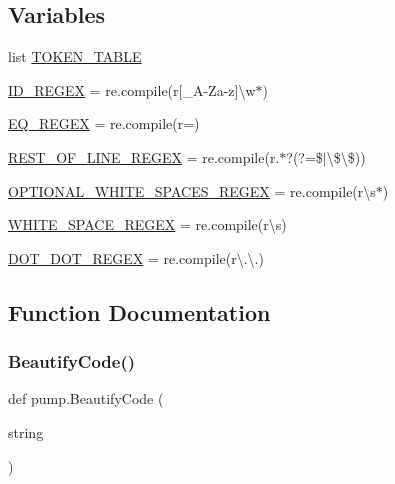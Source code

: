 \subsection*{Variables}
\begin{DoxyCompactItemize}
\item 
list \hyperlink{namespacepump_a132b35d1104c7f479aa21c345f413477}{T\+O\+K\+E\+N\+\_\+\+T\+A\+B\+LE}
\item 
\hyperlink{namespacepump_a8e008923b6c378b8d3df611fb07d6dda}{I\+D\+\_\+\+R\+E\+G\+EX} = re.\+compile(r\textquotesingle{}\mbox{[}\+\_\+A-\/Za-\/z\mbox{]}\textbackslash{}w$\ast$\textquotesingle{})
\item 
\hyperlink{namespacepump_a6397ed9bab62b5c6f60a6626f6b287e0}{E\+Q\+\_\+\+R\+E\+G\+EX} = re.\+compile(r\textquotesingle{}=\textquotesingle{})
\item 
\hyperlink{namespacepump_a4c1f68b32fcb8366051b574cf2e6aef1}{R\+E\+S\+T\+\_\+\+O\+F\+\_\+\+L\+I\+N\+E\+\_\+\+R\+E\+G\+EX} = re.\+compile(r\textquotesingle{}.$\ast$?(?=\$$\vert$\textbackslash{}\$\textbackslash{}\$)\textquotesingle{})
\item 
\hyperlink{namespacepump_a81f03eaffd2c0f4c6a453a0b179e51ca}{O\+P\+T\+I\+O\+N\+A\+L\+\_\+\+W\+H\+I\+T\+E\+\_\+\+S\+P\+A\+C\+E\+S\+\_\+\+R\+E\+G\+EX} = re.\+compile(r\textquotesingle{}\textbackslash{}s$\ast$\textquotesingle{})
\item 
\hyperlink{namespacepump_a4ab1be351870f785a72d324bf56c8316}{W\+H\+I\+T\+E\+\_\+\+S\+P\+A\+C\+E\+\_\+\+R\+E\+G\+EX} = re.\+compile(r\textquotesingle{}\textbackslash{}s\textquotesingle{})
\item 
\hyperlink{namespacepump_a45644ad738e584ec754f6d9f45fe693c}{D\+O\+T\+\_\+\+D\+O\+T\+\_\+\+R\+E\+G\+EX} = re.\+compile(r\textquotesingle{}\textbackslash{}.\textbackslash{}.\textquotesingle{})
\end{DoxyCompactItemize}


\subsection{Function Documentation}
\mbox{\label{namespacepump_a3456db8d85605892d670669c4e238cd7}} 
\subsubsection{\texorpdfstring{Beautify\+Code()}{BeautifyCode()}}
{\footnotesize\ttfamily def pump.\+Beautify\+Code (\begin{DoxyParamCaption}\item[{}]{string }\end{DoxyParamCaption})}

